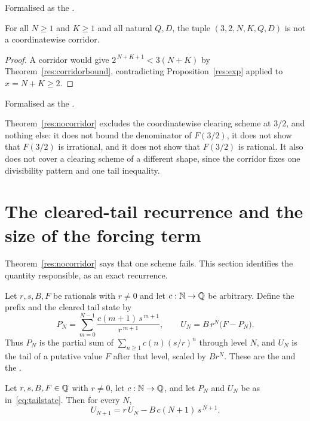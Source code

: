 \documentclass[11pt]{article}
\begin{document}
\noindent Formalised as the
.

\begin{theorem}\label{res:nocorridor}
For all $N\ge1$ and $K\ge1$ and all natural $Q,D$, the tuple
$(3,2,N,K,Q,D)$ is not a coordinatewise corridor.
\end{theorem}

\begin{proof}
A corridor would give $2^{\,N+K+1}<3(N+K)$ by
Theorem~\ref{res:corridorbound}, contradicting Proposition~\ref{res:exp}
applied to $x=N+K\ge2$.
\end{proof}

\noindent Formalised as the
.

Theorem~\ref{res:nocorridor} excludes the coordinatewise clearing scheme at
$3/2$, and nothing else: it does not bound the denominator of $F(3/2)$, it does
not show that $F(3/2)$ is irrational, and it does not show that $F(3/2)$ is
rational.  It also does not cover a clearing scheme of a different shape, since
the corridor fixes one divisibility pattern and one tail inequality.

\section{The cleared-tail recurrence and the size of the forcing
term}\label{sec:tail}

Theorem~\ref{res:nocorridor} says that one scheme fails.  This section
identifies the quantity responsible, as an exact recurrence.

Let $r,s,B,F$ be rationals with $r\ne0$ and let $c:\mathbb{N}\to\mathbb{Q}$ be arbitrary.
Define the prefix and the cleared tail state by
\[
 P_N=\sum_{m=0}^{N-1}\frac{c(m+1)\,s^{\,m+1}}{r^{\,m+1}},
 \qquad
 U_N=B\,r^{N}\bigl(F-P_N\bigr).
\tag{$\ast$}\label{eq:tailstate}
\]
Thus $P_N$ is the partial sum of $\sum_{n\ge1}c(n)(s/r)^{n}$ through level $N$,
and $U_N$ is the tail of a putative value $F$ after that level, scaled by
$Br^{N}$.  These are the
 and the
.

\begin{theorem}\label{res:tailrec}
Let $r,s,B,F\in\mathbb{Q}$ with $r\ne0$, let $c:\mathbb{N}\to\mathbb{Q}$, and let $P_N$ and $U_N$ be as
in~\eqref{eq:tailstate}.  Then for every $N$,
\[
 U_{N+1}=r\,U_N-B\,c(N+1)\,s^{\,N+1}.
\]
\end{theorem}
\end{document}
